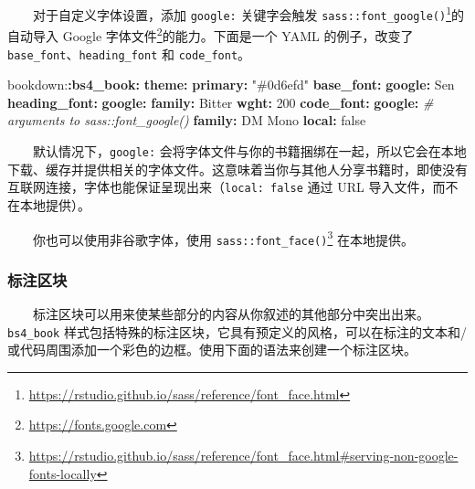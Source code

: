 \documentclass[
  12pt,
]{krantz}
\newenvironment{Shaded}{\begin{snugshade}}{\end{snugshade}}
\newcommand{\AttributeTok}[1]{\textcolor[rgb]{0.13,0.29,0.53}{#1}}
\newcommand{\CharTok}[1]{\textcolor[rgb]{0.31,0.60,0.02}{#1}}
\newcommand{\CommentTok}[1]{\textcolor[rgb]{0.56,0.35,0.01}{\textit{#1}}}
\newcommand{\DecValTok}[1]{\textcolor[rgb]{0.00,0.00,0.81}{#1}}
\newcommand{\FunctionTok}[1]{\textcolor[rgb]{0.13,0.29,0.53}{\textbf{#1}}}
\newcommand{\KeywordTok}[1]{\textcolor[rgb]{0.13,0.29,0.53}{\textbf{#1}}}
\newcommand{\StringTok}[1]{\textcolor[rgb]{0.31,0.60,0.02}{#1}}
\renewcommand{\href}[2]{#2\footnote{\url{#1}}}
\theoremstyle{definition}
\theoremstyle{definition}
\theoremstyle{definition}
\theoremstyle{definition}
\theoremstyle{remark}
\begin{document}
  对于自定义字体设置，添加 \texttt{google:} 关键字会触发 \href{https://rstudio.github.io/sass/reference/font_face.html}{\texttt{sass::font\_google()}}的自动导入 \href{https://fonts.google.com}{Google 字体文件}的能力。下面是一个 YAML 的例子，改变了 \texttt{base\_font}、\texttt{heading\_font} 和 \texttt{code\_font}。

\begin{Shaded}
\begin{Highlighting}[]
\AttributeTok{bookdown:}\FunctionTok{:bs4\_book}\KeywordTok{:}
\AttributeTok{  }\FunctionTok{theme}\KeywordTok{:}
\AttributeTok{    }\FunctionTok{primary}\KeywordTok{:}\AttributeTok{ }\StringTok{"\#0d6efd"}\AttributeTok{   }
\AttributeTok{    }\FunctionTok{base\_font}\KeywordTok{:}\AttributeTok{ }
\AttributeTok{      }\FunctionTok{google}\KeywordTok{:}\AttributeTok{ Sen}
\AttributeTok{    }\FunctionTok{heading\_font}\KeywordTok{:}
\AttributeTok{      }\FunctionTok{google}\KeywordTok{:}
\AttributeTok{        }\FunctionTok{family}\KeywordTok{:}\AttributeTok{ Bitter}
\AttributeTok{        }\FunctionTok{wght}\KeywordTok{:}\AttributeTok{ }\DecValTok{200}
\AttributeTok{    }\FunctionTok{code\_font}\KeywordTok{:}
\AttributeTok{      }\FunctionTok{google}\KeywordTok{:}\AttributeTok{ }
\CommentTok{        \# arguments to sass::font\_google() }
\AttributeTok{        }\FunctionTok{family}\KeywordTok{:}\AttributeTok{ DM Mono}
\AttributeTok{        }\FunctionTok{local}\KeywordTok{:}\AttributeTok{ }\CharTok{false}
\end{Highlighting}
\end{Shaded}

  默认情况下，\texttt{google:} 会将字体文件与你的书籍捆绑在一起，所以它会在本地下载、缓存并提供相关的字体文件。这意味着当你与其他人分享书籍时，即使没有互联网连接，字体也能保证呈现出来（\texttt{local:\ false} 通过 URL 导入文件，而不在本地提供）。

  你也可以使用非谷歌字体，使用 \href{https://rstudio.github.io/sass/reference/font_face.html\#serving-non-google-fonts-locally}{\texttt{sass::font\_face()}} 在本地提供。

\hypertarget{ux6807ux6ce8ux533aux5757}{%
\subsubsection{标注区块}\label{ux6807ux6ce8ux533aux5757}}

  标注区块可以用来使某些部分的内容从你叙述的其他部分中突出出来。\texttt{bs4\_book} 样式包括特殊的标注区块，它具有预定义的风格，可以在标注的文本和/或代码周围添加一个彩色的边框。使用下面的语法来创建一个标注区块。
\end{document}
